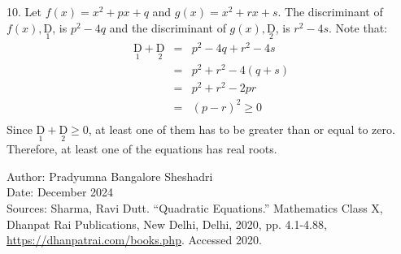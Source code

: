 \documentclass[addpoints, 12pt]{exam}
\theoremstyle{remark}
\begin{document}
10. Let $f(x) = x^2 + px + q$ and $g(x)=x^2+rx+s$. The discriminant of $f(x), \underset{\text{1}}{\text{D}}$, is $p^2-4q$ and the discriminant of $g(x), \underset{\text{2}}{\text{D}}$, is $r^2-4s$. Note that:
\begin{eqnarray*}
    \underset{\text{1}}{\text{D}} + \underset{\text{2}}{\text{D}} & = & p^2 - 4q + r^2 - 4s \\
    & = & p^2 + r^2 - 4(q+s) \\
    & = & p^2 + r^2 - 2pr \\
    & = & (p-r)^2 \geq 0 \\
\end{eqnarray*}
Since $\underset{\text{1}}{\text{D}} + \underset{\text{2}}{\text{D}} \geq 0$, at least one of them has to be greater than or equal to zero. Therefore, at least one of the equations has real roots.

\vfill
\noindent\tiny
Author: Pradyumna Bangalore Sheshadri \\
Date: December 2024 \\
Sources: Sharma, Ravi Dutt. “Quadratic Equations.” Mathematics Class X, Dhanpat Rai Publications, New Delhi, Delhi, 2020, pp. 4.1-4.88, \url{https://dhanpatrai.com/books.php}. Accessed 2020.
\end{document}
